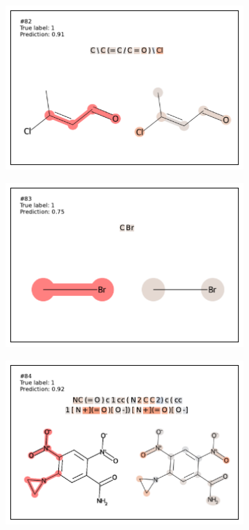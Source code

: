 \begin{figure}
\begin{subfigure}[b]{0.33\textwidth}
\end{subfigure} 
\begin{subfigure}[b]{0.33\textwidth} 
  \centering 
  \includegraphics[width=\textwidth]{figures/ames/ames82.pdf} 
\end{subfigure}\begin{subfigure}[b]{0.33\textwidth} 
  \centering 
  \includegraphics[width=\textwidth]{figures/ames/ames83.pdf} 
\end{subfigure}\begin{subfigure}[b]{0.33\textwidth} 
  \centering 
  \includegraphics[width=\textwidth]{figures/ames/ames84.pdf} 

\end{subfigure}
\end{figure}
